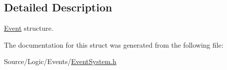 \subsection{Detailed Description}
\mbox{\hyperlink{struct_event}{Event}} structure. 

The documentation for this struct was generated from the following file\+:\begin{DoxyCompactItemize}
\item 
Source/\+Logic/\+Events/\mbox{\hyperlink{_event_system_8h}{Event\+System.\+h}}\end{DoxyCompactItemize}
